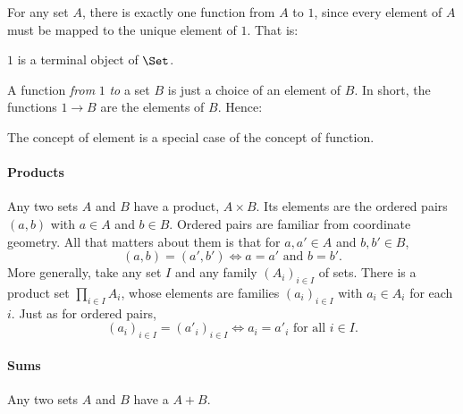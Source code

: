 For any set $A$, there is exactly one function from $A$ to $1$, since every
element of $A$ must be mapped to the unique element of $1$.  That is:
% 
\begin{setprop}
$1$ is a terminal object of \hspace{.1em}$\Set$.
\end{setprop}

A function \emph{from} $1$ \emph{to} a set $B$ is just a choice of an element
of $B$.  In short, the functions $1 \to B$ are the elements of $B$.  Hence:
% 
\begin{slogan}
The concept of element is a special case of the concept of function.%
%
%
\end{slogan} 

\paragraph*{Products}  Any two sets $A$ and $B$ have a product,%
%
%
$A \times B$.%
%
%
  Its elements are the ordered pairs $(a, b)$ with $a \in A$
and $b \in B$.  Ordered pairs are familiar from coordinate geometry.  All
that matters about them is that for $a, a' \in A$ and $b, b' \in B$,
\[
(a, b) = (a', b')
\iff
a = a' \text{ and } b = b'.
\]
More generally, take any set $I$ and any family $(A_i)_{i \in I}$ of sets.
There is a product set $\prod_{i \in I} A_i$,%
%
%
whose elements are families%
%
%
$(a_i)_{i \in I}$ with $a_i \in A_i$ for each $i$.  Just as for ordered
pairs,
\[
(a_i)_{i \in I} = (a'_i)_{i \in I}
\iff
a_i = a'_i \text{ for all } i \in I.
\]

\paragraph*{Sums}  Any two sets $A$ and $B$ have a %
%
%
$A + B$.%
%
%


